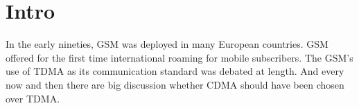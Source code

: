 \documentclass{article}
\begin{document}
\section{Intro}

In the early nineties, \ac{GSM} was deployed in many European
countries. \ac{GSM} offered for the first time international
roaming for mobile subscribers. The \ac{GSM}'s use of \ac{TDMA} as
its communication standard was debated at length. And every now
and then there are big discussion whether \ac{CDMA} should have
been chosen over \ac{TDMA}.


\newpage

\begin{acronym}[TDMA]
\end{acronym}
\end{document}
